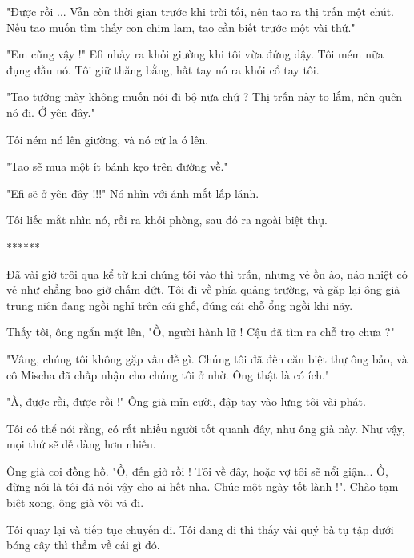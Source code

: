  "Được rồi ... Vẫn còn thời gian trước khi trời tối, nên tao ra thị trấn một chút. Nếu tao muốn tìm thấy con chim lam, tao cần biết trước một vài thứ."
 
 "Em cũng vậy !" Efi nhảy ra khỏi giường khi tôi vừa đứng dậy. Tôi mém nữa đụng đầu nó. Tôi giữ thăng bằng, hất tay nó ra khỏi cổ tay tôi.
 
 "Tao tưởng mày không muốn nói đi bộ nữa chứ ? Thị trấn này to lắm, nên quên nó đi. Ở yên đây."
 
 Tôi ném nó lên giường, và nó cứ la ó lên.
 
 "Tao sẽ mua một ít bánh kẹo trên đường về."
 
 "Efi sẽ ở yên đây !!!" Nó nhìn với ánh mắt lấp lánh.
 
 Tôi liếc mắt nhìn nó, rồi ra khỏi phòng, sau đó ra ngoài biệt thự.\\

 \begin{center}
 	******
 \end{center}
 
  
 Đã vài giờ trôi qua kể từ khi chúng tôi vào thì trấn, nhưng vẻ ồn ào, náo nhiệt có vẻ như chẳng bao giờ chấm dứt. Tôi đi về phía quảng trường, và gặp lại ông già trung niên đang ngồi nghỉ trên cái ghế, đúng cái chỗ ổng ngồi khi nãy.
 
 Thấy tôi, ông ngẩn mặt lên, "Ồ, người hành lữ ! Cậu đã tìm ra chỗ trọ chưa ?"
  
 "Vâng, chúng tôi không gặp vấn đề gì. Chúng tôi đã đến căn biệt thự ông bảo, và cô Mischa đã chấp nhận cho chúng tôi ở nhờ. Ông thật là có ích."
 
 "À, được rồi, được rồi !" Ông già mỉn cười, đập tay vào lưng tôi vài phát.
 
 Tôi có thể nói rằng, có rất nhiều người tốt quanh đây, như ông già này. Như vậy, mọi thứ sẽ dễ dàng hơn nhiều.
 
 Ông già coi đồng hồ. "Ồ, đến giờ rồi ! Tôi về đây, hoặc vợ tôi sẽ nổi giận... Ồ, đừng nói là tôi đã nói vậy cho ai hết nha. Chúc một ngày tốt lành !". Chào tạm biệt xong, ông già vội vã đi.
 
 Tôi quay lại và tiếp tục chuyến đi. Tôi đang đi thì thấy vài quý bà tụ tập dưới bóng cây thì thầm về cái gì đó.
 
